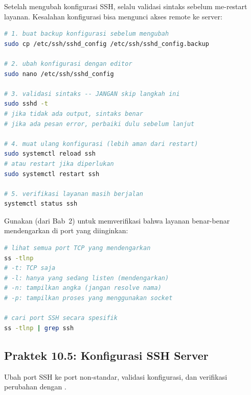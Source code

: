 Setelah mengubah konfigurasi SSH, selalu validasi sintaks sebelum me-restart layanan. Kesalahan konfigurasi bisa mengunci akses remote ke server:

\begin{lstlisting}[language=bash, caption={Alur aman mengubah konfigurasi SSH}]
# 1. buat backup konfigurasi sebelum mengubah
sudo cp /etc/ssh/sshd_config /etc/ssh/sshd_config.backup

# 2. ubah konfigurasi dengan editor
sudo nano /etc/ssh/sshd_config

# 3. validasi sintaks -- JANGAN skip langkah ini
sudo sshd -t
# jika tidak ada output, sintaks benar
# jika ada pesan error, perbaiki dulu sebelum lanjut

# 4. muat ulang konfigurasi (lebih aman dari restart)
sudo systemctl reload ssh
# atau restart jika diperlukan
sudo systemctl restart ssh

# 5. verifikasi layanan masih berjalan
systemctl status ssh
\end{lstlisting}

Gunakan  (dari Bab~2) untuk memverifikasi bahwa layanan benar-benar mendengarkan di port yang diinginkan:

\begin{lstlisting}[language=bash, caption={Verifikasi port dengan ss}]
# lihat semua port TCP yang mendengarkan
ss -tlnp
# -t: TCP saja
# -l: hanya yang sedang listen (mendengarkan)
# -n: tampilkan angka (jangan resolve nama)
# -p: tampilkan proses yang menggunakan socket

# cari port SSH secara spesifik
ss -tlnp | grep ssh
\end{lstlisting}

\subsection*{Praktek 10.5: Konfigurasi SSH Server}

Ubah port SSH ke port non-standar, validasi konfigurasi, dan verifikasi perubahan dengan .

